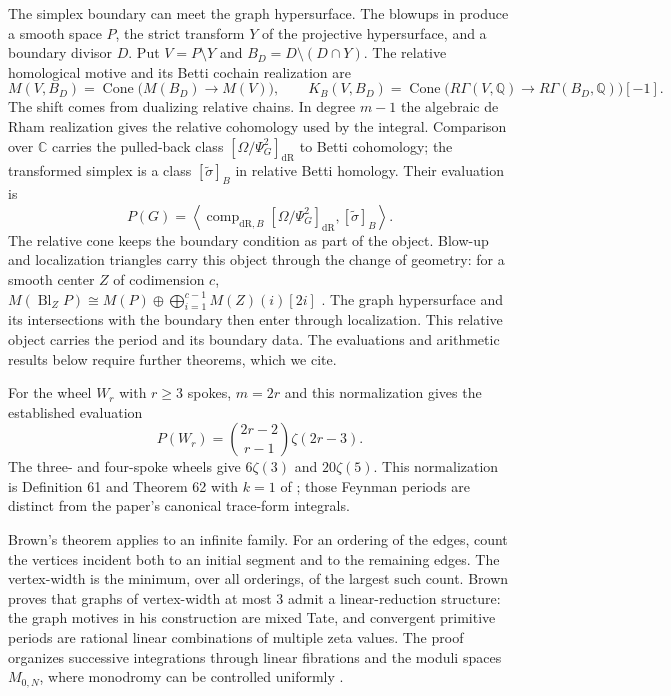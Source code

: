 \documentclass[11pt]{article}
\theoremstyle{definition}
\theoremstyle{remark}
\newcommand{\Q}{\mathbb Q}
\newcommand{\C}{\mathbb C}
\begin{document}
The simplex boundary can meet the graph hypersurface. The blowups in
\cite[\S7]{BEKGraphPolynomials} produce a smooth space $P$, the strict
transform $Y$ of the projective hypersurface, and a boundary divisor $D$.
Put $V=P\setminus Y$ and $B_D=D\setminus(D\cap Y)$. The relative
homological motive and its Betti cochain realization are
\[
 M(V,B_D)=\operatorname{Cone}\bigl(M(B_D)\to M(V)\bigr),\qquad
 K_B(V,B_D)=\operatorname{Cone}\bigl(R\Gamma(V,\Q)
                         \to R\Gamma(B_D,\Q)\bigr)[-1].
\]
The shift comes from dualizing relative chains. In degree $m-1$ the
algebraic de Rham realization gives the relative cohomology used by the
integral. Comparison over $\C$ carries the pulled-back class
$[\Omega/\Psi_G^2]_{\mathrm{dR}}$ to Betti cohomology; the transformed
simplex is a class $[\widetilde\sigma]_B$ in relative Betti homology.
Their evaluation is
\[
 P(G)=\left\langle
       \operatorname{comp}_{\mathrm{dR},B}
          [\Omega/\Psi_G^2]_{\mathrm{dR}},
       [\widetilde\sigma]_B\right\rangle.
\]
The relative cone keeps the boundary condition as part of the object.
Blow-up and localization triangles carry this object through the change
of geometry: for a smooth center $Z$ of codimension $c$,
$M(\operatorname{Bl}_ZP)\cong M(P)\oplus
\bigoplus_{i=1}^{c-1}M(Z)(i)[2i]$
\cite[Proposition 3.5.3]{dagVoevodsky2000}.
The graph hypersurface and its intersections with the boundary then enter
through localization. This relative object carries the period and its
boundary data. The evaluations and arithmetic results below require
further theorems, which we cite.

For the wheel $W_r$ with $r\ge3$ spokes, $m=2r$ and this normalization
gives the established evaluation
\[
  P(W_r)=\binom{2r-2}{r-1}\zeta(2r-3).
\]
The three- and four-spoke wheels give $6\zeta(3)$ and $20\zeta(5)$. This normalization is Definition 61 and Theorem 62 with $k=1$ of \cite{BrownSchnetzWheelClasses}; those Feynman periods are distinct from the paper's canonical trace-form integrals.

Brown's theorem applies to an infinite family. For an ordering of the edges, count the vertices incident both to an initial segment and to the remaining edges. The vertex-width is the minimum, over all orderings, of the largest such count. Brown proves that graphs of vertex-width at most $3$ admit a linear-reduction structure: the graph motives in his construction are mixed Tate, and convergent primitive periods are rational linear combinations of multiple zeta values. The proof organizes successive integrations through linear fibrations and the moduli spaces $M_{0,N}$, where monodromy can be controlled uniformly \cite[Introduction, Theorems 1--3]{BrownFeynmanPeriods}.
\end{document}

